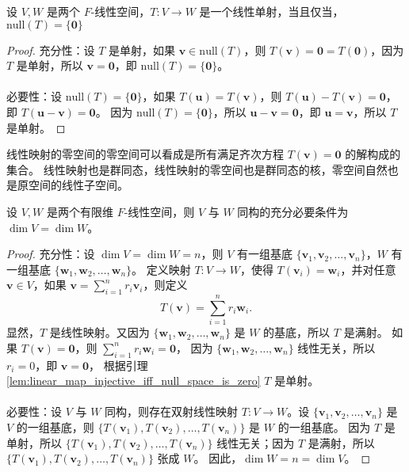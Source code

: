 \begin{lemma}[线性单射的充要条件]
    设 $V,W$ 是两个 $F$-线性空间，$T:V\to W$ 是一个线性单射，当且仅当，$\mathrm{null}(T) = \{\mathbf{0}\}$
    \label{lem:linear_map_injective_iff_null_space_is_zero}
\end{lemma}
\begin{proof}
    充分性：设 $T$ 是单射，如果 $\mathbf{v}\in \mathrm{null}(T)$，则 $T(\mathbf{v}) = \mathbf{0} = T(\mathbf{0})$，因为 $T$ 是单射，所以 $\mathbf{v} = \mathbf{0}$，即 $\mathrm{null}(T) = \{\mathbf{0}\}$。
    \\
    \\
    必要性：设 $\mathrm{null}(T) = \{\mathbf{0}\}$，如果 $T(\mathbf{u}) = T(\mathbf{v})$，则 $T(\mathbf{u}) - T(\mathbf{v}) = \mathbf{0}$，即 $T(\mathbf{u}-\mathbf{v}) = \mathbf{0}$。
    因为 $\mathrm{null}(T) = \{\mathbf{0}\}$，所以 $\mathbf{u}-\mathbf{v} = \mathbf{0}$，即 $\mathbf{u} = \mathbf{v}$，所以 $T$ 是单射。
\end{proof}
\begin{note}
    线性映射的零空间的零空间可以看成是所有满足齐次方程 $T(\mathbf{v}) = \mathbf{0}$ 的解构成的集合。
    线性映射也是群同态，线性映射的零空间也是群同态的核，零空间自然也是原空间的线性子空间。
\end{note}
\vspace{0.5em}

\begin{theorem}[有限维线性空间同构的充要条件]
    设 $V,W$ 是两个有限维 $F$-线性空间，则 $V$ 与 $W$ 同构的充分必要条件为 $\dim V = \dim W$。
    \label{thm:finite_dimensional_linear_space_isomorphism}
\end{theorem}

\begin{proof}
    充分性：设 $\dim V = \dim W = n$，则 $V$ 有一组基底 $\{\mathbf{v}_1,\mathbf{v}_2,\ldots,\mathbf{v}_n\}$，$W$ 有一组基底 $\{\mathbf{w}_1,\mathbf{w}_2,\ldots,\mathbf{w}_n\}$。
    定义映射 $T:V\to W$，使得 $T(\mathbf{v}_i) = \mathbf{w}_i$，并对任意 $\mathbf{v}\in V$，如果 $\mathbf{v} = \sum_{i=1}^{n} r_i \mathbf{v}_i$，则定义
    \[
        T(\mathbf{v}) = \sum_{i=1}^{n} r_i \mathbf{w}_i.
    \]
    显然，$T$ 是线性映射。又因为 $\{\mathbf{w}_1,\mathbf{w}_2,\ldots,\mathbf{w}_n\}$ 是 $W$ 的基底，所以 $T$ 是满射。
    如果 $T(\mathbf{v}) = \mathbf{0}$，则 $\sum_{i=1}^{n} r_i \mathbf{w}_i = \mathbf{0}$，
    因为 $\{\mathbf{w}_1,\mathbf{w}_2,\ldots,\mathbf{w}_n\}$ 线性无关，所以 $r_i = 0$，即 $\mathbf{v} = \mathbf{0}$，
    根据引理 \ref{lem:linear_map_injective_iff_null_space_is_zero} $T$ 是单射。
    \\
    \\
    必要性：设 $V$ 与 $W$ 同构，则存在双射线性映射 $T:V\to W$。设 $\{\mathbf{v}_1,\mathbf{v}_2,\ldots,\mathbf{v}_n\}$ 是 $V$ 的一组基底，则 $\{T(\mathbf{v}_1),T(\mathbf{v}_2),\ldots,T(\mathbf{v}_n)\}$ 是 $W$ 的一组基底。
    因为 $T$ 是单射，所以 $\{T(\mathbf{v}_1),T(\mathbf{v}_2),\ldots,T(\mathbf{v}_n)\}$ 线性无关；因为 $T$ 是满射，所以 $\{T(\mathbf{v}_1),T(\mathbf{v}_2),\ldots,T(\mathbf{v}_n)\}$ 张成 $W$。
    因此，$\dim W = n = \dim V$。
\end{proof}

